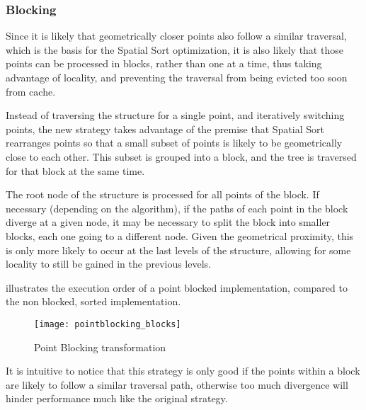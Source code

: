 \subsubsection{Blocking}
\label{sec:optim:block}

Since it is likely that geometrically closer points also follow a similar traversal, which is the basis for the Spatial Sort optimization, it is also likely that those points can be processed in blocks, rather than one at a time, thus taking advantage of locality, and preventing the traversal from being evicted too soon from cache.

Instead of traversing the structure for a single point, and iteratively switching points, the new strategy takes advantage of the premise that Spatial Sort rearranges points so that a small subset of points is likely to be geometrically close to each other. This subset is grouped into a block, and the tree is traversed for that block at the same time.

The root node of the structure is processed for all points of the block. If necessary (depending on the algorithm), if the paths of each point in the block diverge at a given node, it may be necessary to split the block into smaller blocks, each one going to a different node. Given the geometrical proximity, this is only more likely to occur at the last levels of the structure, allowing for some locality to still be gained in the previous levels.

 illustrates the execution order of a point blocked implementation, compared to the non blocked, sorted implementation.

\begin{figure}[!htp]
	\centering
	\texttt{[image: pointblocking\_blocks]}
	\caption{Point Blocking transformation}
	\label{fig:sort}
\end{figure}

It is intuitive to notice that this strategy is only good if the points within a block are likely to follow a similar traversal path, otherwise too much divergence will hinder performance much like the original strategy.
